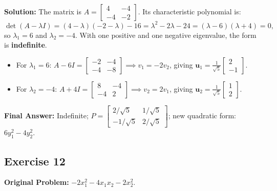 \documentclass[11pt, letterpaper]{article}
\theoremstyle{definition}
\theoremstyle{remark}
\begin{document}
\textbf{Solution:}
The matrix is $A = \begin{bmatrix} 4 & -4 \\ -4 & -2 \end{bmatrix}$. Its characteristic polynomial is:
\[
\det(A - \lambda I) = (4-\lambda)(-2-\lambda) - 16 = \lambda^2 - 2\lambda - 24 = (\lambda - 6)(\lambda + 4) = 0,
\]
so $\lambda_1 = 6$ and $\lambda_2 = -4$. With one positive and one negative eigenvalue, the form is \textbf{indefinite}.
\begin{itemize}
    \item For $\lambda_1 = 6$: $A - 6I = \begin{bmatrix} -2 & -4 \\ -4 & -8 \end{bmatrix} \implies v_1 = -2v_2$, giving $\mathbf{u}_1 = \frac{1}{\sqrt{5}}\begin{bmatrix} 2 \\ -1 \end{bmatrix}$.
    \item For $\lambda_2 = -4$: $A + 4I = \begin{bmatrix} 8 & -4 \\ -4 & 2 \end{bmatrix} \implies v_2 = 2v_1$, giving $\mathbf{u}_2 = \frac{1}{\sqrt{5}}\begin{bmatrix} 1 \\ 2 \end{bmatrix}$.
\end{itemize}
\textbf{Final Answer:} Indefinite; $P = \begin{bmatrix} 2/\sqrt{5} & 1/\sqrt{5} \\ -1/\sqrt{5} & 2/\sqrt{5} \end{bmatrix}$; new quadratic form: $6y_1^2 - 4y_2^2$.

\hrulefill

\subsection*{Exercise 12}
\textbf{Original Problem:} $-2x_1^2 - 4x_1x_2 - 2x_2^2$.
\end{document}
